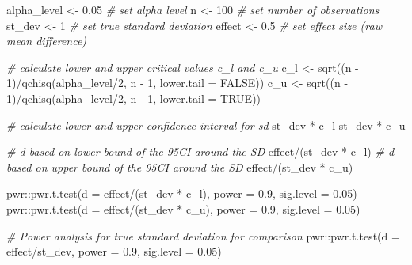 \documentclass[
  oneside]{krantz}
\makeatletter
\newenvironment{Shaded}{\begin{snugshade}}{\end{snugshade}}
\newcommand{\AttributeTok}[1]{\textcolor[rgb]{0.61,0.61,0.61}{#1}}
\newcommand{\CommentTok}[1]{\textcolor[rgb]{0.37,0.37,0.37}{\textit{#1}}}
\newcommand{\ConstantTok}[1]{\textcolor[rgb]{0,0,0}{#1}}
\newcommand{\DecValTok}[1]{\textcolor[rgb]{0.06,0.06,0.06}{#1}}
\newcommand{\FloatTok}[1]{\textcolor[rgb]{0.06,0.06,0.06}{#1}}
\newcommand{\FunctionTok}[1]{\textcolor[rgb]{0,0,0}{#1}}
\newcommand{\NormalTok}[1]{#1}
\newcommand{\OtherTok}[1]{\textcolor[rgb]{0.37,0.37,0.37}{#1}}
\newcommand{\SpecialCharTok}[1]{\textcolor[rgb]{0,0,0}{#1}}
\newenvironment{kframe}{%
\medskip{}
\setlength{\fboxsep}{.8em}
 \def\at@end@of@kframe{}%
 \ifinner\ifhmode%
  \def\at@end@of@kframe{\end{minipage}}%
  \begin{minipage}{\columnwidth}%
 \fi\fi%
 \def\FrameCommand##1{\hskip\@totalleftmargin \hskip-\fboxsep
 \colorbox{shadecolor}{##1}\hskip-\fboxsep
     \hskip-\linewidth \hskip-\@totalleftmargin \hskip\columnwidth}%
 \MakeFramed {\advance\hsize-\width
   \@totalleftmargin\z@ \linewidth\hsize
   \@setminipage}}%
 {\par\unskip\endMakeFramed%
 \at@end@of@kframe}
\renewenvironment{Shaded}{\begin{kframe}}{\end{kframe}}
\makeatother
\begin{document}
\begin{Shaded}
\begin{Highlighting}[]
\NormalTok{alpha\_level }\OtherTok{\textless{}{-}} \FloatTok{0.05} \CommentTok{\# set alpha level}
\NormalTok{n }\OtherTok{\textless{}{-}} \DecValTok{100} \CommentTok{\# set number of observations}
\NormalTok{st\_dev }\OtherTok{\textless{}{-}} \DecValTok{1} \CommentTok{\# set true standard deviation}
\NormalTok{effect }\OtherTok{\textless{}{-}} \FloatTok{0.5} \CommentTok{\# set effect size (raw mean difference)}

\CommentTok{\# calculate lower and upper critical values c\_l and c\_u}
\NormalTok{c\_l }\OtherTok{\textless{}{-}} \FunctionTok{sqrt}\NormalTok{((n }\SpecialCharTok{{-}} \DecValTok{1}\NormalTok{)}\SpecialCharTok{/}\FunctionTok{qchisq}\NormalTok{(alpha\_level}\SpecialCharTok{/}\DecValTok{2}\NormalTok{, n }\SpecialCharTok{{-}} \DecValTok{1}\NormalTok{, }\AttributeTok{lower.tail =} \ConstantTok{FALSE}\NormalTok{))}
\NormalTok{c\_u }\OtherTok{\textless{}{-}} \FunctionTok{sqrt}\NormalTok{((n }\SpecialCharTok{{-}} \DecValTok{1}\NormalTok{)}\SpecialCharTok{/}\FunctionTok{qchisq}\NormalTok{(alpha\_level}\SpecialCharTok{/}\DecValTok{2}\NormalTok{, n }\SpecialCharTok{{-}} \DecValTok{1}\NormalTok{, }\AttributeTok{lower.tail =} \ConstantTok{TRUE}\NormalTok{))}

\CommentTok{\# calculate lower and upper confidence interval for sd}
\NormalTok{st\_dev }\SpecialCharTok{*}\NormalTok{ c\_l}
\NormalTok{st\_dev }\SpecialCharTok{*}\NormalTok{ c\_u}

\CommentTok{\# d based on lower bound of the 95CI around the SD}
\NormalTok{effect}\SpecialCharTok{/}\NormalTok{(st\_dev }\SpecialCharTok{*}\NormalTok{ c\_l)}
\CommentTok{\# d based on upper bound of the 95CI around the SD}
\NormalTok{effect}\SpecialCharTok{/}\NormalTok{(st\_dev }\SpecialCharTok{*}\NormalTok{ c\_u)}

\NormalTok{pwr}\SpecialCharTok{::}\FunctionTok{pwr.t.test}\NormalTok{(}\AttributeTok{d =}\NormalTok{ effect}\SpecialCharTok{/}\NormalTok{(st\_dev }\SpecialCharTok{*}\NormalTok{ c\_l), }\AttributeTok{power =} \FloatTok{0.9}\NormalTok{, }\AttributeTok{sig.level =} \FloatTok{0.05}\NormalTok{)}
\NormalTok{pwr}\SpecialCharTok{::}\FunctionTok{pwr.t.test}\NormalTok{(}\AttributeTok{d =}\NormalTok{ effect}\SpecialCharTok{/}\NormalTok{(st\_dev }\SpecialCharTok{*}\NormalTok{ c\_u), }\AttributeTok{power =} \FloatTok{0.9}\NormalTok{, }\AttributeTok{sig.level =} \FloatTok{0.05}\NormalTok{)}

\CommentTok{\# Power analysis for true standard deviation for comparison}
\NormalTok{pwr}\SpecialCharTok{::}\FunctionTok{pwr.t.test}\NormalTok{(}\AttributeTok{d =}\NormalTok{ effect}\SpecialCharTok{/}\NormalTok{st\_dev, }\AttributeTok{power =} \FloatTok{0.9}\NormalTok{, }\AttributeTok{sig.level =} \FloatTok{0.05}\NormalTok{)}
\end{Highlighting}
\end{Shaded}
\end{document}
